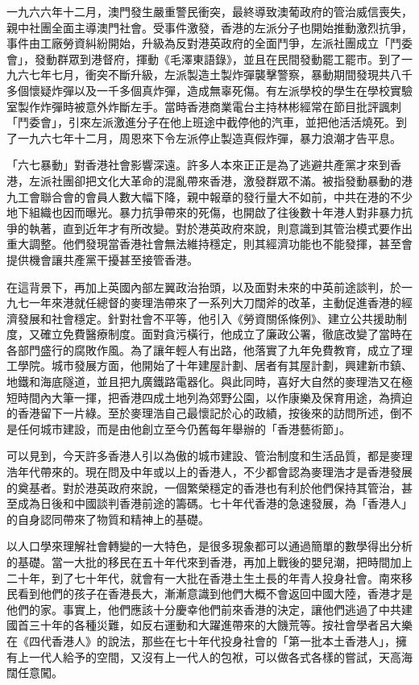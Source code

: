 一九六六年十二月，澳門發生嚴重警民衝突，最終導致澳葡政府的管治威信喪失，親中社團全面主導澳門社會。受事件激發，香港的左派分子也開始推動激烈抗爭，事件由工廠勞資糾紛開始，升級為反對港英政府的全面鬥爭，左派社團成立「鬥委會」，發動群眾到港督府，揮動《毛澤東語錄》，並且在民間發動罷工罷市。到了一九六七年七月，衝突不斷升級，左派製造土製炸彈襲擊警察，暴動期間發現共八千多個懷疑炸彈以及一千多個真炸彈，造成無辜死傷。有左派學校的學生在學校實驗室製作炸彈時被意外炸斷左手。當時香港商業電台主持林彬經常在節目批評諷刺「鬥委會」，引來左派激進分子在他上班途中截停他的汽車，並把他活活燒死。到了一九六七年十二月，周恩來下令左派停止製造真假炸彈，暴力浪潮才告平息。

「六七暴動」對香港社會影響深遠。許多人本來正正是為了逃避共產黨才來到香港，左派社團卻把文化大革命的混亂帶來香港，激發群眾不滿。被指發動暴動的港九工會聯合會的會員人數大幅下降，親中報章的發行量大不如前，中共在港的不少地下組織也因而曝光。暴力抗爭帶來的死傷，也開啟了往後數十年港人對非暴力抗爭的執著，直到近年才有所改變。對於港英政府來說，則意識到其管治模式要作出重大調整。他們發現當香港社會無法維持穩定，則其經濟功能也不能發揮，甚至會提供機會讓共產黨干擾甚至接管香港。

在這背景下，再加上英國內部左翼政治抬頭，以及面對未來的中英前途談判，於一九七一年來港就任總督的麥理浩帶來了一系列大刀闊斧的改革，主動促進香港的經濟發展和社會穩定。針對社會不平等，他引入《勞資關係條例》、建立公共援助制度，又確立免費醫療制度。面對貪污橫行，他成立了廉政公署，徹底改變了當時在各部門盛行的腐敗作風。為了讓年輕人有出路，他落實了九年免費教育，成立了理工學院。城市發展方面，他開始了十年建屋計劃、居者有其屋計劃，興建新市鎮、地鐵和海底隧道，並且把九廣鐵路電器化。與此同時，喜好大自然的麥理浩又在極短時間內大筆一揮，把香港四成土地列為郊野公園，以作康樂及保育用途，為擠迫的香港留下一片綠。至於麥理浩自己最懷記於心的政績，按後來的訪問所述，倒不是任何城市建設，而是由他創立至今仍舊每年舉辦的「香港藝術節」。

可以見到，今天許多香港人引以為傲的城市建設、管治制度和生活品質，都是麥理浩年代帶來的。現在問及中年或以上的香港人，不少都會認為麥理浩才是香港發展的奠基者。對於港英政府來說，一個繁榮穩定的香港也有利於他們保持其管治，甚至成為日後和中國談判香港前途的籌碼。七十年代香港的急速發展，為「香港人」的自身認同帶來了物質和精神上的基礎。

以人口學來理解社會轉變的一大特色，是很多現象都可以通過簡單的數學得出分析的基礎。當一大批的移民在五十年代來到香港，再加上戰後的嬰兒潮，把時間加上二十年，到了七十年代，就會有一大批在香港土生土長的年青人投身社會。南來移民看到他們的孩子在香港長大，漸漸意識到他們大概不會返回中國大陸，香港才是他們的家。事實上，他們應該十分慶幸他們前來香港的決定，讓他們逃過了中共建國首三十年的各種災難，如反右運動和大躍進帶來的大饑荒等。按社會學者呂大樂在《四代香港人》的說法，那些在七十年代投身社會的「第一批本土香港人」，擁有上一代人給予的空間，又沒有上一代人的包袱，可以做各式各樣的嘗試，天高海闊任意闖。

